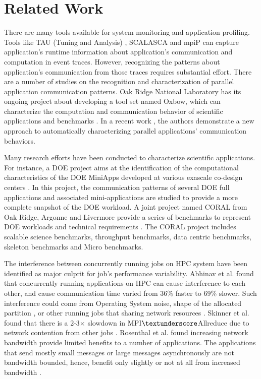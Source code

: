 \section{Related Work}
\label{sec:related_work}

There are many tools available for system monitoring and application profiling. Tools like TAU (Tuning and Analysis) \cite{tau}, SCALASCA \cite{scala} and mpiP \cite{mpip} can capture application's runtime information about application's communication and computation in event traces. However, recognizing the patterns about application's communication from those traces requires substantial effort. There are a number of studies on the recognition and characterization of parallel application communication patterns. Oak Ridge National Laboratory has its ongoing project about developing a tool set named Oxbow, which can characterize the computation and communication behavior of scientific applications and benchmarks \cite{oxbow}. In a recent work \cite{roth}, the authors demonstrate a new approach to automatically characterizing parallel applications' communication behaviors. 


Many research efforts have been conducted to characterize scientific applications. For instance, a DOE project aims at the identification of the computational characteristics of the DOE MiniApps developed at various exascale co-design centers \cite{designforwardwebpage}. In this project, the communication patterns of several DOE full applications and associated mini-applications are studied to provide a more complete snapshot of the DOE workload. A joint project named CORAL from Oak Ridge, Argonne and Livermore provide a series of benchmarks to represent DOE workloads and technical requirements \cite{coral}. The CORAL project includes scalable science benchmarks, throughput benchmarks, data centric benchmarks, skeleton benchmarks and Micro benchmarks.  

The interference between concurrently running jobs on HPC system have been identified as major culprit for job's performance variability. Abhinav et al. found that concurrently running applications on HPC can cause interference to each other, and cause communication time varied from 36\% faster to 69\% slower. Such interference could come from Operating System noise, shape of the allocated partition , or other running jobs that sharing network resources \cite{abhinav-sc13}. Skinner et al. found that  there is a 2-3$\times$ slowdown in MPI$\textunderscore$Allreduce due to network contention from other jobs \cite{skinner}. Rosenthal et al. found increasing network bandwidth provide limited benefits to a number of applications. The applications that send mostly small messages or large messages asynchronously are not bandwidth bounded, hence, benefit only slightly or not at all from increased bandwidth \cite{rosenthal}.

